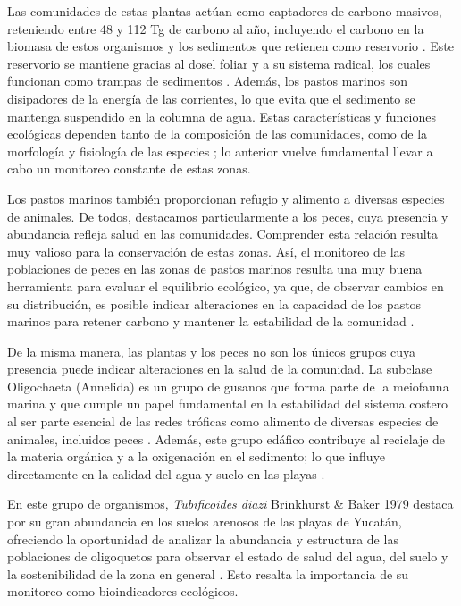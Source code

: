 \documentclass[
  authoryear,
  preprint,
  3p,
  twocolumn]{elsarticle}
\begin{document}
Las comunidades de estas plantas actúan como captadores de carbono
masivos, reteniendo entre 48 y 112 Tg de carbono al año, incluyendo el
carbono en la biomasa de estos organismos y los sedimentos que retienen
como reservorio \citep{Kennedy2010, OCANA2023102979}. Este reservorio se
mantiene gracias al dosel foliar y a su sistema radical, los cuales
funcionan como trampas de sedimentos \citep{Fourqurean2012}. Además, los
pastos marinos son disipadores de la energía de las corrientes, lo que
evita que el sedimento se mantenga suspendido en la columna de agua.
Estas características y funciones ecológicas dependen tanto de la
composición de las comunidades, como de la morfología y fisiología de
las especies \citep{GarciaDuarte2001}; lo anterior vuelve fundamental
llevar a cabo un monitoreo constante de estas zonas.

Los pastos marinos también proporcionan refugio y alimento a diversas
especies de animales. De todos, destacamos particularmente a los peces,
cuya presencia y abundancia refleja salud en las comunidades. Comprender
esta relación resulta muy valioso para la conservación de estas zonas.
Así, el monitoreo de las poblaciones de peces en las zonas de pastos
marinos resulta una muy buena herramienta para evaluar el equilibrio
ecológico, ya que, de observar cambios en su distribución, es posible
indicar alteraciones en la capacidad de los pastos marinos para retener
carbono y mantener la estabilidad de la comunidad
\citep{AguilarMedrano2007, CHOVANEC2003639}.

De la misma manera, las plantas y los peces no son los únicos grupos
cuya presencia puede indicar alteraciones en la salud de la comunidad.
La subclase Oligochaeta (Annelida) es un grupo de gusanos que forma
parte de la meiofauna marina y que cumple un papel fundamental en la
estabilidad del sistema costero al ser parte esencial de las redes
tróficas como alimento de diversas especies de animales, incluidos peces
\citep{Diaz1987}. Además, este grupo edáfico contribuye al reciclaje de
la materia orgánica y a la oxigenación en el sedimento; lo que influye
directamente en la calidad del agua y suelo en las playas
\citep{Giere2006, Verdonschot2001, Collado1999}.

En este grupo de organismos, \emph{Tubificoides diazi} Brinkhurst \&
Baker 1979 destaca por su gran abundancia en los suelos arenosos de las
playas de Yucatán, ofreciendo la oportunidad de analizar la abundancia y
estructura de las poblaciones de oligoquetos para observar el estado de
salud del agua, del suelo y la sostenibilidad de la zona en general
\citep{behrend_takeda_gomes_fernandes_2012}. Esto resalta la importancia
de su monitoreo como bioindicadores ecológicos.
\end{document}
